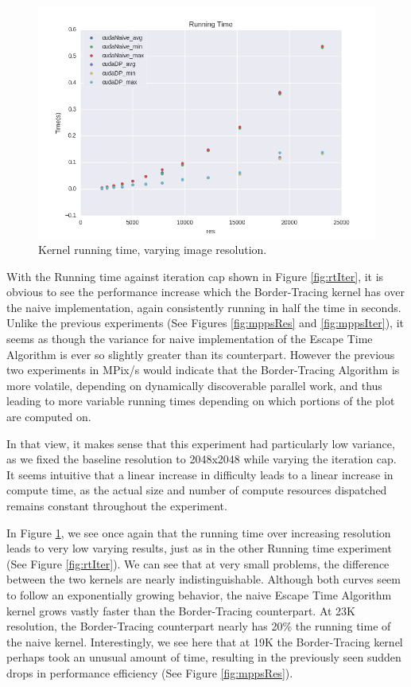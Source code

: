 \documentclass[letterpaper]{article}
\begin{document}
\begin{multicols}{2}
\begin{figure}[H]
  \includegraphics[width=\linewidth]{../experiments3/running_time_graph_exp_res.png}
  \caption{Kernel running time, varying image resolution.}
  \label{fig:rtRes}
\end{figure}

With the Running time against iteration cap shown in Figure \ref{fig:rtIter}, it
  is obvious to see the performance increase which the Border-Tracing kernel has
  over the naive implementation, again consistently running in half the time in
  seconds. Unlike the previous experiments (See Figures \ref{fig:mppsRes} and
  \ref{fig:mppsIter}), it seems as though the variance for naive implementation
  of the Escape Time Algorithm is ever so slightly greater than its counterpart.
However the previous two experiments in MPix/s would indicate that the
  Border-Tracing Algorithm is more volatile, depending on dynamically
  discoverable parallel work, and thus leading to more variable running times
  depending on which portions of the plot are computed on. 

In that view, it makes sense that this experiment had particularly low variance,
  as we fixed the baseline resolution to 2048x2048 while varying the iteration
  cap. It seems intuitive that a linear increase in difficulty leads to a linear
  increase in compute time, as the actual size and number of compute resources
  dispatched remains constant throughout the experiment. 

In Figure \ref{fig:rtRes}, we see once again that the running time over
  increasing resolution leads to very low varying results, just as in the other
  Running time experiment (See Figure \ref{fig:rtIter}). We can see that at very
  small problems, the difference between the two kernels are nearly
  indistinguishable. Although both curves seem to follow an exponentially
  growing behavior, the naive Escape Time Algorithm kernel grows vastly faster
  than the Border-Tracing counterpart. At 23K resolution, the Border-Tracing
  counterpart nearly has 20\% the running time of the naive kernel.
  Interestingly, we see here that at 19K the Border-Tracing kernel perhaps took
  an unusual amount of time, resulting in the previously seen sudden drops in
  performance efficiency (See Figure \ref{fig:mppsRes}).  


\end{multicols}
\end{document}
